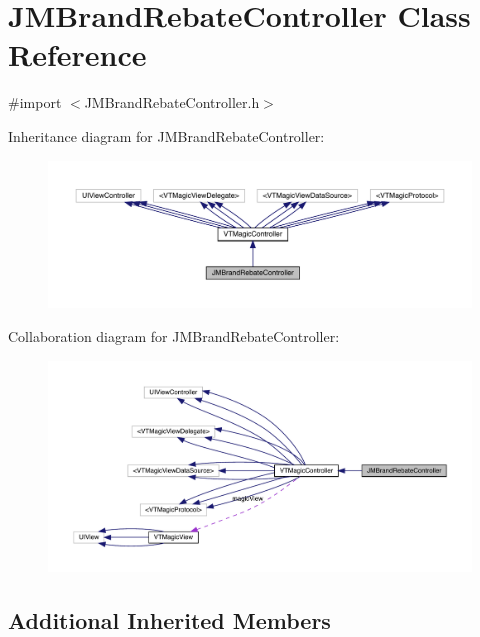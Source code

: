 \hypertarget{interface_j_m_brand_rebate_controller}{}\section{J\+M\+Brand\+Rebate\+Controller Class Reference}
\label{interface_j_m_brand_rebate_controller}


{\ttfamily \#import $<$J\+M\+Brand\+Rebate\+Controller.\+h$>$}



Inheritance diagram for J\+M\+Brand\+Rebate\+Controller\+:\nopagebreak
\begin{figure}[H]
\begin{center}
\leavevmode
\includegraphics[width=350pt]{interface_j_m_brand_rebate_controller__inherit__graph}
\end{center}
\end{figure}


Collaboration diagram for J\+M\+Brand\+Rebate\+Controller\+:\nopagebreak
\begin{figure}[H]
\begin{center}
\leavevmode
\includegraphics[width=350pt]{interface_j_m_brand_rebate_controller__coll__graph}
\end{center}
\end{figure}
\subsection*{Additional Inherited Members}


